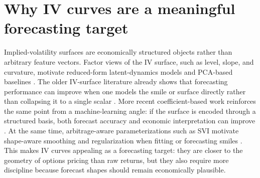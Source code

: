 \documentclass[12pt]{report}
\begin{document}
\section{Why IV curves are a meaningful forecasting target}
Implied-volatility surfaces are economically structured objects rather than arbitrary feature vectors. Factor views of the IV surface, such as level, slope, and curvature, motivate reduced-form latent-dynamics models and PCA-based baselines \citep{cont2002dynamics}. The older IV-surface literature already shows that forecasting performance can improve when one models the smile or surface directly rather than collapsing it to a single scalar \citep{bernales2014,kearney2019}. More recent coefficient-based work reinforces the same point from a machine-learning angle: if the surface is encoded through a structured basis, both forecast accuracy and economic interpretation can improve \citep{chen2024bspline}. At the same time, arbitrage-aware parameterizations such as SVI motivate shape-aware smoothing and regularization when fitting or forecasting smiles \citep{gatheral2014arbitrage}. This makes IV curves appealing as a forecasting target: they are closer to the geometry of options pricing than raw returns, but they also require more discipline because forecast shapes should remain economically plausible.
\end{document}
